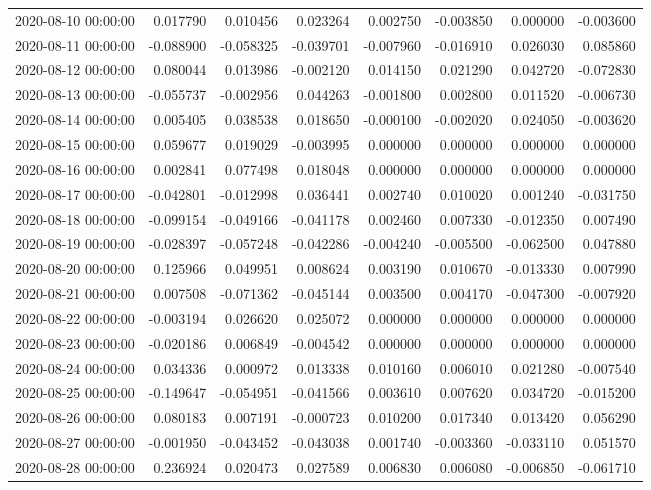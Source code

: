 \begin{tabular}{lrrrrrrr}
2020-08-10 00:00:00 & 0.017790 & 0.010456 & 0.023264 & 0.002750 & -0.003850 & 0.000000 & -0.003600 \\
2020-08-11 00:00:00 & -0.088900 & -0.058325 & -0.039701 & -0.007960 & -0.016910 & 0.026030 & 0.085860 \\
2020-08-12 00:00:00 & 0.080044 & 0.013986 & -0.002120 & 0.014150 & 0.021290 & 0.042720 & -0.072830 \\
2020-08-13 00:00:00 & -0.055737 & -0.002956 & 0.044263 & -0.001800 & 0.002800 & 0.011520 & -0.006730 \\
2020-08-14 00:00:00 & 0.005405 & 0.038538 & 0.018650 & -0.000100 & -0.002020 & 0.024050 & -0.003620 \\
2020-08-15 00:00:00 & 0.059677 & 0.019029 & -0.003995 & 0.000000 & 0.000000 & 0.000000 & 0.000000 \\
2020-08-16 00:00:00 & 0.002841 & 0.077498 & 0.018048 & 0.000000 & 0.000000 & 0.000000 & 0.000000 \\
2020-08-17 00:00:00 & -0.042801 & -0.012998 & 0.036441 & 0.002740 & 0.010020 & 0.001240 & -0.031750 \\
2020-08-18 00:00:00 & -0.099154 & -0.049166 & -0.041178 & 0.002460 & 0.007330 & -0.012350 & 0.007490 \\
2020-08-19 00:00:00 & -0.028397 & -0.057248 & -0.042286 & -0.004240 & -0.005500 & -0.062500 & 0.047880 \\
2020-08-20 00:00:00 & 0.125966 & 0.049951 & 0.008624 & 0.003190 & 0.010670 & -0.013330 & 0.007990 \\
2020-08-21 00:00:00 & 0.007508 & -0.071362 & -0.045144 & 0.003500 & 0.004170 & -0.047300 & -0.007920 \\
2020-08-22 00:00:00 & -0.003194 & 0.026620 & 0.025072 & 0.000000 & 0.000000 & 0.000000 & 0.000000 \\
2020-08-23 00:00:00 & -0.020186 & 0.006849 & -0.004542 & 0.000000 & 0.000000 & 0.000000 & 0.000000 \\
2020-08-24 00:00:00 & 0.034336 & 0.000972 & 0.013338 & 0.010160 & 0.006010 & 0.021280 & -0.007540 \\
2020-08-25 00:00:00 & -0.149647 & -0.054951 & -0.041566 & 0.003610 & 0.007620 & 0.034720 & -0.015200 \\
2020-08-26 00:00:00 & 0.080183 & 0.007191 & -0.000723 & 0.010200 & 0.017340 & 0.013420 & 0.056290 \\
2020-08-27 00:00:00 & -0.001950 & -0.043452 & -0.043038 & 0.001740 & -0.003360 & -0.033110 & 0.051570 \\
2020-08-28 00:00:00 & 0.236924 & 0.020473 & 0.027589 & 0.006830 & 0.006080 & -0.006850 & -0.061710 \\

\end{tabular}
